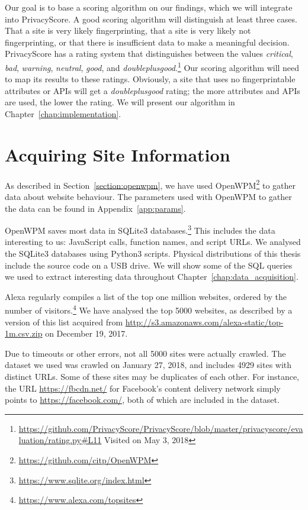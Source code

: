 \documentclass[
    fontsize=12pt,
    headings=small,
    parskip=half,
    bibliography=totoc,
    numbers=noenddot,
    open=any
    ]{scrreprt}
\begin{document}
Our goal is to base a scoring algorithm on our findings, which we will integrate into PrivacyScore.
A good scoring algorithm will distinguish at least three cases. That a site is very likely fingerprinting,
that a site is very likely not fingerprinting, or that there is insufficient data to make a meaningful decision.
PrivacyScore has a rating system that distinguishes between the values
\textit{critical}, \textit{bad}, \textit{warning}, \textit{neutral}, \textit{good},
and \textit{doubleplusgood}.\footnote{\url{https://github.com/PrivacyScore/PrivacyScore/blob/master/privacyscore/evaluation/rating.py\#L11} Visited on May 3, 2018}
Our scoring algorithm will need to map its results to these ratings. Obviously, a site that uses no fingerprintable
attributes or APIs will get a \textit{doubleplusgood} rating; the more attributes and APIs are used, the lower the rating.
We will present our algorithm in Chapter~\ref{chap:implementation}.

\section{Acquiring Site Information}
\label{sec:acquiring_information}
As described in Section~\ref{section:openwpm}, we have used OpenWPM\footnote{\url{https://github.com/citp/OpenWPM}} to gather data about
website behaviour.
The parameters used with OpenWPM to gather the data can be found in Appendix~\ref{app:params}.

OpenWPM saves most data in SQLite3 databases.\footnote{\url{https://www.sqlite.org/index.html}}
This includes the data interesting to us: JavaScript calls, function names, and script URLs.
We analysed the SQLite3 databases using Python3 scripts.
Physical distributions of this thesis include the source code on a USB drive.
We will show some of the SQL queries we used to extract interesting data throughout Chapter~\ref{chap:data_acquisition}.

Alexa regularly compiles a list of the top one million websites, ordered by the number of
visitors.\footnote{\url{https://www.alexa.com/topsites}}
We have analysed the top 5000 websites, as described by a version of this list acquired from
\url{http://s3.amazonaws.com/alexa-static/top-1m.csv.zip} on December 19, 2017.

Due to timeouts or other errors, not all 5000 sites were actually crawled.
The dataset we used was crawled on January 27, 2018, and includes 4929 sites with distinct URLs. Some of these sites
may be duplicates of each other. For instance, the URL \url{https://fbcdn.net/} for Facebook's content delivery
network simply points to \url{https://facebook.com/}, both of which are included in the dataset.
\end{document}
